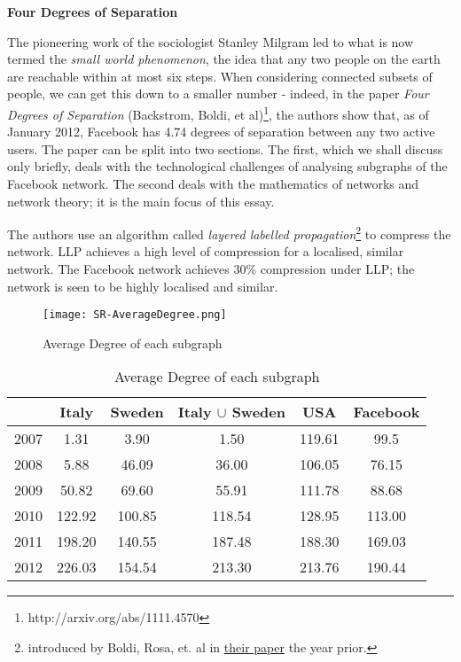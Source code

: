     \textbf{Four Degrees of Separation}
    
    The pioneering work of the sociologist Stanley Milgram led to what is now termed the \textit{small world phenomenon}, the idea that any two people on the earth are reachable within at most six steps. When considering connected subsets of people, we can get this down to a smaller number - indeed, in the paper \textit{Four Degrees of Separation} (Backstrom, Boldi, et al)\footnote{http://arxiv.org/abs/1111.4570}, the authors show that, as of January 2012, Facebook has 4.74 degrees of separation between any two active users. The paper can be split into two sections. The first, which we shall discuss only briefly, deals with the technological challenges of analysing subgraphs of the Facebook network. The second deals with the mathematics of networks and network theory; it is the main focus of this essay.
    
    The authors use an algorithm called \textit{layered labelled propagation}\footnote{introduced by Boldi, Rosa, et. al in \href{https://arxiv.org/pdf/1011.5425.pdf}{their paper} the year prior.} to compress the network. LLP achieves a high level of compression for a localised, similar network. The Facebook network achieves 30\% compression under LLP; the network is seen to be highly localised and similar. 
    
    \begin{figure}[H]
        \centering
        \texttt{[image: SR-AverageDegree.png]}
        \caption{Average Degree of each subgraph}
        \label{fig:avdeg}
    \end{figure}
    \begin{table}[H]
        \centering
        \begin{tabular}{c|c|c|c|c|c}
            \toprule
            & Italy & Sweden & Italy $\cup$ Sweden & USA & Facebook \\
            \midrule
            2007 & 1.31 & 3.90 & 1.50 & 119.61 & 99.5 \\
            2008 & 5.88 & 46.09 & 36.00 & 106.05 & 76.15 \\
            2009 & 50.82 & 69.60 & 55.91 & 111.78 & 88.68 \\
            2010 & 122.92 & 100.85 & 118.54 & 128.95 & 113.00 \\
            2011 & 198.20 & 140.55 & 187.48 & 188.30 & 169.03 \\
            2012 & 226.03 & 154.54 & 213.30 & 213.76 & 190.44 \\
            \bottomrule
        \end{tabular}
        \caption{Average Degree of each subgraph}
        \label{tab:avdeg}
    \end{table}
    
